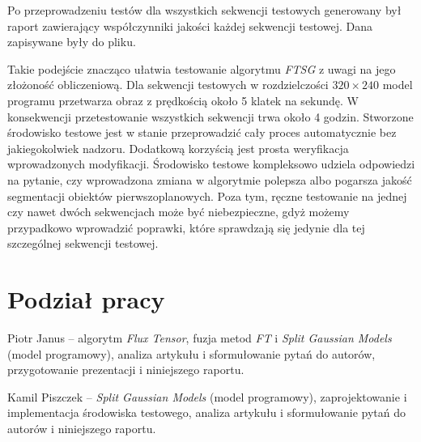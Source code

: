 \documentclass[10pt,a4paper]{article}
\begin{document}
\noindent Po przeprowadzeniu testów dla wszystkich sekwencji testowych generowany był raport zawierający współczynniki jakości każdej sekwencji testowej. Dana zapisywane były do pliku. 

Takie podejście znacząco ułatwia testowanie algorytmu \textit{FTSG} z uwagi na jego złożoność obliczeniową. Dla sekwencji testowych w rozdzielczości $320 \times 240$ model programu przetwarza obraz z prędkością około 5 klatek na sekundę. W konsekwencji przetestowanie wszystkich sekwencji trwa około 4 godzin. Stworzone środowisko testowe jest w stanie przeprowadzić cały proces automatycznie bez jakiegokolwiek nadzoru. Dodatkową korzyścią jest prosta weryfikacja wprowadzonych modyfikacji. Środowisko testowe kompleksowo udziela odpowiedzi na pytanie, czy wprowadzona zmiana w algorytmie polepsza albo pogarsza jakość segmentacji obiektów pierwszoplanowych. Poza tym, ręczne testowanie na jednej czy nawet dwóch sekwencjach może być niebezpieczne, gdyż możemy przypadkowo wprowadzić poprawki, które sprawdzają się jedynie dla tej szczególnej sekwencji testowej.

\section{Podział pracy}

Piotr Janus -- algorytm \textit{Flux Tensor}, fuzja metod \textit{FT} i \textit{Split Gaussian Models} (model programowy), analiza artykułu i sformułowanie pytań do autorów, przygotowanie prezentacji i niniejszego raportu.

Kamil Piszczek --  \textit{Split Gaussian Models} (model programowy), zaprojektowanie i implementacja środowiska testowego,  analiza artykułu i sformułowanie pytań do autorów i niniejszego raportu. 
\end{document}
